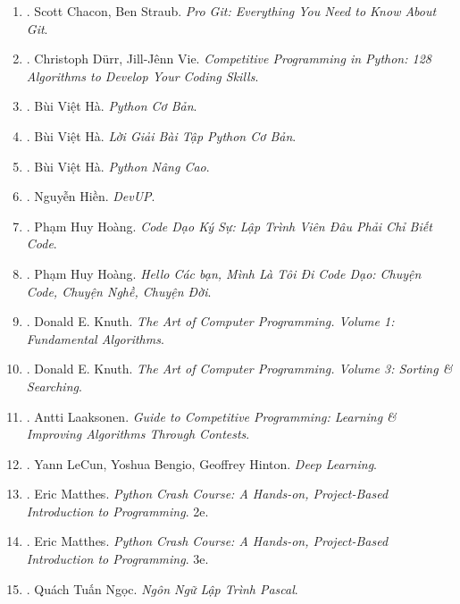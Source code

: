 \documentclass{article}
\begin{document}
\begin{enumerate}
	\item \cite{Chacon_Straub2014}. Scott Chacon, Ben Straub. \textit{Pro Git: Everything You Need to Know About Git}.\hfill{\sf[reading]}
	\item \cite{Durr_Vie2021}. Christoph D\"urr, Jill-J\^enn Vie. \textit{Competitive Programming in Python: 128 Algorithms to Develop Your Coding Skills}.\\\mbox{}\hfill{\sf[reading]}
	\item \cite{Ha_Python_co_ban}. Bùi Việt Hà. \textit{Python Cơ Bản}.\hfill{\sf[finished]}
	\item \cite{Ha_loi_giai_BT_Python_co_ban}. Bùi Việt Hà. \textit{Lời Giải Bài Tập Python Cơ Bản}.\hfill{\sf[reading]}
	\item \cite{Ha_Python_nang_cao}. Bùi Việt Hà. \textit{Python Nâng Cao}.\hfill{\sf[finished]}
	\item \cite{Hien_DevUp}. Nguyễn Hiền. \textit{DevUP}.\hfill{\sf[finished]}
	\item \cite{Hoang_code_dao_ky_su}. Phạm Huy Hoàng. \textit{Code Dạo Ký Sự: Lập Trình Viên Đâu Phải Chỉ Biết Code}.\hfill{\sf[finished]}
	\item \cite{Hoang_toi_di_code_dao}. Phạm Huy Hoàng. \textit{Hello Các bạn, Mình Là Tôi Đi Code Dạo: Chuyện Code, Chuyện Nghề, Chuyện Đời}.\hfill{\sf[finished]}
	\item \cite{Knuth1997}. Donald E. Knuth. \textit{The Art of Computer Programming. Volume 1: Fundamental Algorithms}.\hfill{\sf[reading]}
	\item \cite{Knuth1998}. Donald E. Knuth. \textit{The Art of Computer Programming. Volume 3: Sorting \& Searching}.\hfill{\sf[reading]}
	\item \cite{Laaksonen2020}. Antti Laaksonen. \textit{Guide to Competitive Programming: Learning \& Improving Algorithms Through Contests}.\hfill{\sf[reading]}
	\item \cite{LeCun_Bengio_Hinton2015}. Yann LeCun, Yoshua Bengio, Geoffrey Hinton. \textit{Deep Learning}.\hfill{\sf[reading]}
	\item \cite{Matthes2019}. Eric Matthes. \textit{Python Crash Course: A Hands-on, Project-Based Introduction to Programming}. 2e.\hfill{\sf[reading]}
	\item \cite{Matthes2023}. Eric Matthes. \textit{Python Crash Course: A Hands-on, Project-Based Introduction to Programming}. 3e.\hfill{\sf[reading]}
	\item \cite{Ngoc_Pascal}. Quách Tuấn Ngọc. \textit{Ngôn Ngữ Lập Trình Pascal}.\hfill{\sf[reading]}

\end{enumerate}
\end{document}

